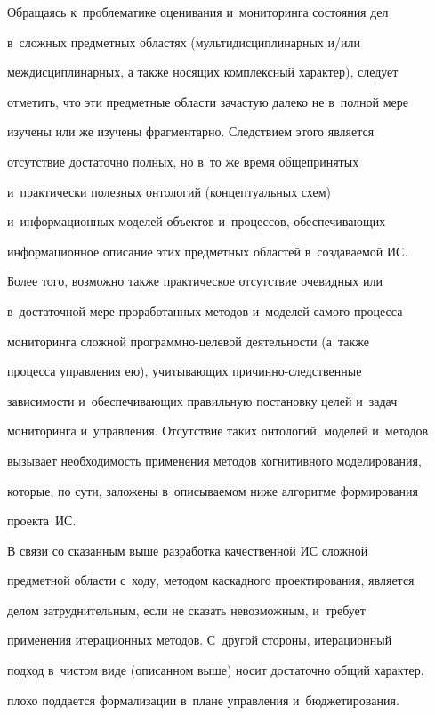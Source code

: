      Обращаясь к~проблематике оценивания и~мониторинга состояния дел 


в~сложных предметных областях (мультидисциплинарных и/или 


междисциплинарных, а также носящих комплексный характер), следует 


отметить, что эти предметные области зачастую далеко не в~полной мере 


изучены или же изучены фрагментарно. Следствием этого является 


отсутствие достаточно полных, но в~то же время общепринятых 


и~практически полезных онтологий (концептуальных схем) 


и~информационных моделей объектов и~процессов, обеспечивающих 


информационное описание этих предметных областей в~создаваемой ИС. 


Более того, возможно также практическое отсутствие очевидных или 


в~достаточной мере проработанных методов и~моделей самого процесса 


мониторинга сложной про\-граммно-це\-ле\-вой деятельности (а~также 


процесса управления ею), учитывающих при\-чин\-но-след\-ст\-вен\-ные 


зависимости и~обеспечивающих правильную постановку целей и~задач 


мониторинга и~управления. Отсутствие таких онтологий, моделей и~методов 


вызывает необходимость применения методов когнитивного моделирования, 


которые, по сути, заложены в~описываемом ниже алгоритме формирования 


проекта~ИС.


     


     В связи со сказанным выше разработка качественной ИС сложной 


предметной области с~ходу, методом каскадного проектирования, является 


делом затруднительным, если не сказать невозможным, и~требует 


применения итерационных методов. С~другой стороны, итерационный 


подход в~чистом виде (описанном выше) носит достаточно общий характер, 


плохо поддается формализации в~плане управления и~бюджетирования. 


